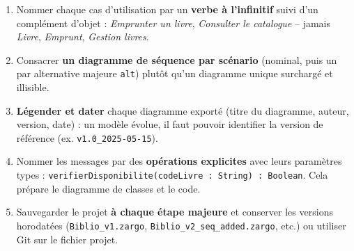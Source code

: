 \documentclass[11pt]{article}
\begin{document}
\begin{propriete}
\begin{enumerate}
\item Nommer chaque cas d'utilisation par un \textbf{verbe à l'infinitif} suivi d'un complément d'objet : \emph{Emprunter un livre}, \emph{Consulter le catalogue} -- jamais \emph{Livre}, \emph{Emprunt}, \emph{Gestion livres}.
\item Consacrer \textbf{un diagramme de séquence par scénario} (nominal, puis un par alternative majeure \texttt{alt}) plutôt qu'un diagramme unique surchargé et illisible.
\item \textbf{Légender et dater} chaque diagramme exporté (titre du diagramme, auteur, version, date) : un modèle évolue, il faut pouvoir identifier la version de référence (ex. \texttt{v1.0\_2025-05-15}).
\item Nommer les messages par des \textbf{opérations explicites} avec leurs paramètres types : \texttt{verifierDisponibilite(codeLivre : String) : Boolean}. Cela prépare le diagramme de classes et le code.
\item Sauvegarder le projet \textbf{à chaque étape majeure} et conserver les versions horodatées (\texttt{Biblio\_v1.zargo}, \texttt{Biblio\_v2\_seq\_added.zargo}, etc.) ou utiliser Git sur le fichier projet.
\end{enumerate}
\end{propriete}
\end{document}
